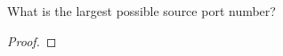 \documentclass[../../main.tex]{subfiles}
\begin{document}
\begin{wts}
What is the largest possible source port number?  
\end{wts}
\begin{proof}

\end{proof}
\end{document}
